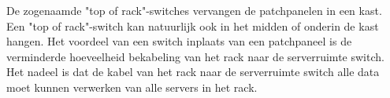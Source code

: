 De zogenaamde "top of rack"-switches vervangen de patchpanelen in een kast. Een "top of rack"-switch kan natuurlijk ook in het midden of onderin de kast hangen. Het voordeel van een switch inplaats van een patchpaneel is de verminderde hoeveelheid bekabeling van het rack naar de serverruimte switch. Het nadeel is dat de kabel van het rack naar de serverruimte switch alle data moet kunnen verwerken van alle servers in het rack.
